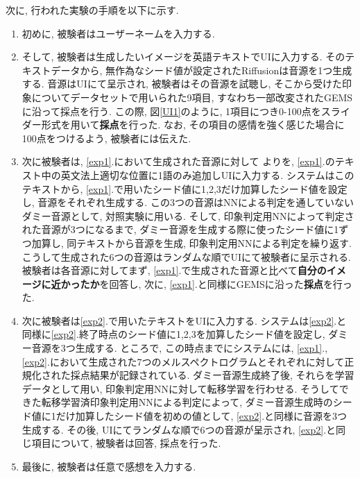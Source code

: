 \documentclass[a4paper,11pt,dvipdfmx]{jreport}
\begin{document}
次に, 行われた実験の手順を以下に示す.
\begin{enumerate}
  \item 初めに, 被験者はユーザーネームを入力する.
  \item そして, 被験者は生成したいイメージを英語テキストでUIに入力する.
        そのテキストデータから, 無作為なシード値が設定されたRiffusionは音源を1つ生成する.
        音源はUIにて呈示され, 被験者はその音源を試聴し, そこから受けた印象についてデータセットで用いられた9項目, すなわち一部改変されたGEMSに沿って採点を行う.
        この際, 図\ref{UI1}のように, 1項目につき0-100点をスライダー形式を用いて\textbf{採点}を行った. なお, その項目の感情を強く感じた場合に100点をつけるよう, 被験者には伝えた.\label{exp1}
  \item 次に被験者は, \ref{exp1}.において生成された音源に対して
        よりを, 
        \ref{exp1}.のテキスト中の英文法上適切な位置に1語のみ追加しUIに入力する.
        システムはこのテキストから, \ref{exp1}.で用いたシード値に1,2,3だけ加算したシード値を設定し, 音源をそれぞれ生成する. この3つの音源はNNによる判定を通していないダミー音源として, 対照実験に用いる. そして, 印象判定用NNによって判定された音源が3つになるまで, ダミー音源を生成する際に使ったシード値に1ずつ加算し, 同テキストから音源を生成, 印象判定用NNによる判定を繰り返す. こうして生成された6つの音源はランダムな順でUIにて被験者に呈示される. 被験者は各音源に対してまず, \ref{exp1}.で生成された音源と比べて\textbf{自分のイメージに近かったか}を回答し, 次に, \ref{exp1}.と同様にGEMSに沿った\textbf{採点}を行った.\label{exp2}
  \item 次に被験者は\ref{exp2}.で用いたテキストをUIに入力する.
        システムは\ref{exp2}.と同様に\ref{exp2}.終了時点のシード値に1,2,3を加算したシード値を設定し, ダミー音源を3つ生成する.
        ところで, この時点までにシステムには, \ref{exp1}.,\ref{exp2}.において生成された7つのメルスペクトログラムとそれぞれに対して正規化された採点結果が記録されている.
        ダミー音源生成終了後, それらを学習データとして用い, 印象判定用NNに対して転移学習を行わせる. そうしてできた転移学習済印象判定用NNによる判定によって, ダミー音源生成時のシード値に1だけ加算したシード値を初めの値として, \ref{exp2}.と同様に音源を3つ生成する.
        その後, UIにてランダムな順で6つの音源が呈示され, \ref{exp2}.と同じ項目について, 被験者は回答, 採点を行った.\label{exp3}
  \item 最後に, 被験者は任意で感想を入力する.
\end{enumerate}
\end{document}
